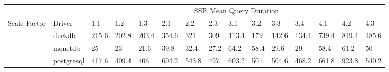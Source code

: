 \begin{table}[]
\begin{tabular}{ll|lllllllllllll}
                      &            & \multicolumn{13}{c|}{SSB Mean Query Duration}                                                                                                                                                                                                                                                                                                                                                                                                        \\
Scale Factor          & Driver     & 1.1                         & 1.2                         & 1.3                         & 2.1                         & 2.2                         & 2.3                         & 3.1                         & 3.2                          & 3.3                         & 3.4                         & 4.1                         & 4.2                                                 & 4.3                                                 \\ \hline
                      & duckdb     & 215.6                       & 202.8                       & 203.4                       & 354.6                       & 321                         & 309                         & 413.4                       & 179                          & 142.6                       & 134.4                       & 739.4                       & 849.4                                               & 485.6                                               \\
                      & monetdb    & {\color[HTML]{009901} 25}   & {\color[HTML]{009901} 23}   & {\color[HTML]{009901} 21.6} & {\color[HTML]{009901} 39.8} & {\color[HTML]{009901} 32.4} & {\color[HTML]{009901} 27.2} & {\color[HTML]{009901} 64.2} & {\color[HTML]{009901} 58.4}  & {\color[HTML]{009901} 29.6} & {\color[HTML]{009901} 29}   & {\color[HTML]{009901} 58.4} & {\color[HTML]{009901} 61.2}                         & {\color[HTML]{009901} 50}                           \\
                      & postgresql & 417.6                       & 409.4                       & 406                         & 604.2                       & 543.8                       & 497                         & 603.2                       & 501                          & 504.6                       & 468.2                       & 661.8                       & 923.8                                               & 540.2                                               \\

\end{tabular}
\end{table}
